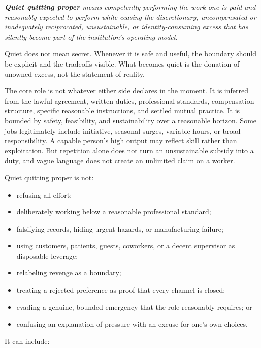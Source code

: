 \documentclass[11pt,oneside]{article}
\providecommand{\tightlist}{%
  \setlength{\itemsep}{0.22em}\setlength{\parskip}{0pt}}
\renewenvironment{quote}
  {\begin{tcolorbox}[
      enhanced,
      breakable,
      colback=ManifestLight,
      colframe=ManifestRule,
      boxrule=0pt,
      leftrule=3pt,
      arc=0pt,
      outer arc=0pt,
      left=10pt,right=10pt,top=8pt,bottom=8pt,
      before skip=0.8em,after skip=0.8em
    ]\itshape}
  {\end{tcolorbox}}
\begin{document}
\begin{quote}
\textbf{Quiet quitting proper} means competently performing the work one
is paid and reasonably expected to perform while ceasing the
discretionary, uncompensated or inadequately reciprocated,
unsustainable, or identity-consuming excess that has silently become
part of the institution's operating model.
\end{quote}

Quiet does not mean secret. Whenever it is safe and useful, the boundary
should be explicit and the tradeoffs visible. What becomes quiet is the
donation of unowned excess, not the statement of reality.

The core role is not whatever either side declares in the moment. It is
inferred from the lawful agreement, written duties, professional
standards, compensation structure, specific reasonable instructions, and
settled mutual practice. It is bounded by safety, feasibility, and
sustainability over a reasonable horizon. Some jobs legitimately include
initiative, seasonal surges, variable hours, or broad responsibility. A
capable person's high output may reflect skill rather than exploitation.
But repetition alone does not turn an unsustainable subsidy into a duty,
and vague language does not create an unlimited claim on a worker.

Quiet quitting proper is not:

\begin{itemize}
\tightlist
\item
  refusing all effort;
\item
  deliberately working below a reasonable professional standard;
\item
  falsifying records, hiding urgent hazards, or manufacturing failure;
\item
  using customers, patients, guests, coworkers, or a decent supervisor
  as disposable leverage;
\item
  relabeling revenge as a boundary;
\item
  treating a rejected preference as proof that every channel is closed;
\item
  evading a genuine, bounded emergency that the role reasonably
  requires; or
\item
  confusing an explanation of pressure with an excuse for one's own
  choices.
\end{itemize}

It can include:
\end{document}
